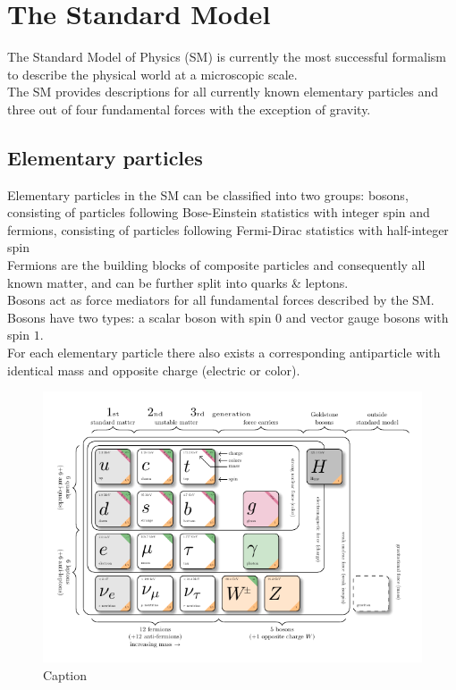 \documentclass[../thesis.tex]{subfiles}
\begin{document}
\vspace{-1\baselineskip}

\section{The Standard Model}
\label{sec:SM}
The Standard Model of Physics (\acs{SM}) is currently the most successful formalism to describe the physical world at a microscopic scale.\\
The \acs{SM} provides descriptions for all currently known elementary particles and three out of four fundamental forces with the exception of gravity.\\
\subsection{Elementary particles}
Elementary particles in the \acs{SM} can be classified into two groups: bosons, consisting of particles following Bose-Einstein statistics with integer spin and fermions, consisting of particles following Fermi-Dirac statistics with half-integer spin\\
Fermions are the building blocks of composite particles and consequently all known matter, and can be further split into quarks \& leptons.\\
Bosons act as force mediators for all fundamental forces described by the \acs{SM}. Bosons have two types: a scalar boson with spin $0$ and vector gauge bosons with spin $1$.\\
For each elementary particle there also exists a corresponding antiparticle with identical mass and opposite charge (electric or color).

\begin{figure}[!htbp]
\begin{center}
\includegraphics[width=\linewidth]{fig/theory_smparticles.pdf}
\caption[Caption]{\label{fig:smparticles}Caption\citep{theory:smparticles}}
\end{center}
\end{figure}
\end{document}
